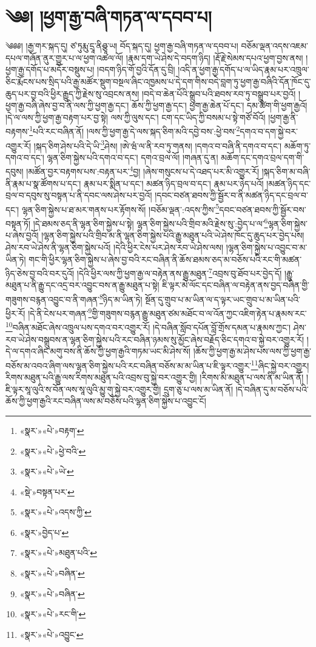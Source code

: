 \chapter{༄༅། །ཕྱག་རྒྱ་བཞི་གཏན་ལ་དབབ་པ།}༄༅༅། །རྒྱ་གར་སྐད་དུ། ཙ་ཏུརྨུ་དྲཱ་ནིཤྩཱ་ཡ། བོད་སྐད་དུ། ཕྱག་རྒྱ་བཞི་གཏན་ལ་དབབ་པ། བཅོམ་ལྡན་འདས་འཇམ་དཔལ་གཞོན་ནུར་གྱུར་པ་ལ་ཕྱག་འཚལ་ལོ། །རྣམ་དག་ཡེ་ཤེས་དེ་བདག་ཉིད། །རྡོ་རྗེ་སེམས་དཔའ་ཕྱག་བྱས་ནས། །ཕྱག་རྒྱ་དགོད་པ་མདོར་བསྡུས་པ། །བདག་ཉིད་གོ་བྱའི་དོན་དུ་བྲི། །འདི་ན་ཕྱག་རྒྱ་དགོད་པ་ལ་ཡིད་རྣམ་པར་འཁྲུལ་ཅིང་རྨོངས་པས་སྲིད་པའི་རྒྱ་མཚོར་སྡུག་བསྔལ་ཞིང་འཁྱམས་པ་དེ་དག་གིས་བདེ་བླག་ཏུ་ཕྱག་རྒྱ་བཞིའི་དོན་ཁོང་དུ་ཆུད་པར་བྱ་བའི་ཕྱིར་རྒྱུད་ཀྱི་རྗེས་སུ་འབྲངས་ནས། །བདེ་བ་ཆེན་པོའི་སྒྲུབ་པའི་ཐབས་རབ་ཏུ་བསྒྲུབ་པར་བྱའོ། །ཕྱག་རྒྱ་བཞི་ཞེས་བྱ་བ་ནི་ལས་ཀྱི་ཕྱག་རྒྱ་དང་། ཆོས་ཀྱི་ཕྱག་རྒྱ་དང་། ཕྱག་རྒྱ་ཆེན་པོ་དང་། དམ་ཚིག་གི་ཕྱག་རྒྱའོ། །དེ་ལ་ལས་ཀྱི་ཕྱག་རྒྱ་བརྟག་པར་བྱ་སྟེ། ལས་ཀྱི་ལུས་དང་། ངག་དང་ཡིད་ཀྱི་བསམ་པ་སྟེ་གཙོ་བོའོ། །ཕྱག་རྒྱ་ནི་བརྟགས་\footnote{«སྣར་»«པེ་»བརྟག་}པའི་རང་བཞིན་ནོ། །ལས་ཀྱི་ཕྱག་རྒྱ་དེ་ལས་སྐད་ཅིག་མའི་དབྱེ་བས་:ཕྱེ་བས་\footnote{«སྣར་»«པེ་»ཕྱེ་བའི་}དགའ་བ་དག་སྐྱེ་བར་འགྱུར་རོ། །སྐད་ཅིག་ཤེས་པའི་དེ་ཡི་\footnote{«སྣར་»«པེ་»ཡེ་}ཤེས། །ཨེ་ཝཾ་ལ་ནི་རབ་ཏུ་གནས། །དགའ་བ་བཞི་ནི་དགའ་བ་དང་། མཆོག་ཏུ་དགའ་བ་དང་། ལྷན་ཅིག་སྐྱེས་པའི་དགའ་བ་དང་། དགའ་བྲལ་ལོ། །གཞན་དུ་ན། མཆོག་དང་དགའ་བྲལ་དག་གི་དབུས། །མཚོན་བྱར་བརྟགས་པས་:བརྟན་པར་\footnote{«སྡེ་»བསྟན་པར་}བྱ། །ཞེས་གསུངས་པ་དེ་འཐད་པར་མི་འགྱུར་རོ། །སྐད་ཅིག་མ་བཞི་ནི་རྣམ་པ་སྣ་ཚོགས་པ་དང་། རྣམ་པར་སྨིན་པ་དང་། མཚན་ཉིད་བྲལ་བ་དང་། རྣམ་པར་ཉེད་པའོ། །མཚན་ཉིད་དང་བྲལ་བ་དབུས་སུ་བསྟན་པ་ནི་དབང་ལས་ཤེས་པར་བྱའོ། །དབང་བཙན་ཐབས་ཀྱི་སྦྱོར་བ་ནི་མཚན་ཉིད་དང་བྲལ་བ་དང་། ལྷན་ཅིག་སྐྱེས་པ་ཐ་མར་གནས་པར་རྟོགས་སོ། །བཅོམ་ལྡན་:འདས་ཀྱིས་\footnote{«སྣར་»«པེ་»འདས་ཀྱི་}དབང་བཙན་ཐབས་ཀྱི་སྦྱོར་བས་བསྟན་ཏོ། །དེ་ཐམས་ཅད་ནི་ལྷན་ཅིག་སྐྱེས་པ་སྟེ། ལྷན་ཅིག་སྐྱེས་པའི་གྲིབ་མའི་རྗེས་སུ་:བྱེད་པ་ལ་\footnote{«སྣར་»བྱེད་པ་}ལྷན་ཅིག་སྐྱེས་པ་ཞེས་བྱའོ། །ལྷན་ཅིག་སྐྱེས་པའི་གྲིབ་མ་ནི་ལྷན་ཅིག་སྐྱེས་པའི་རྒྱུ་མཐུན་པའི་ཡེ་ཤེས་ཁོང་དུ་ཆུད་པར་བྱེད་པས། ཤེས་རབ་ཡེ་ཤེས་ནི་ལྷན་ཅིག་སྐྱེས་པའོ། །དེའི་ཕྱིར་ངེས་པར་ཤེས་རབ་ཡེ་ཤེས་ལས། །ལྷན་ཅིག་སྐྱེས་པ་འབྱུང་བ་མ་ཡིན་ཏེ། གང་གི་ཕྱིར་ལྷན་ཅིག་སྐྱེས་པ་ཞེས་བྱ་བའི་རང་བཞིན་ནི་ཆོས་ཐམས་ཅད་མ་བཅོས་པའི་རང་གི་མཚན་ཉིད་ཅེས་བྱ་བའི་བར་དུའོ། །དེའི་ཕྱིར་ལས་ཀྱི་ཕྱག་རྒྱ་ལ་བརྟེན་ནས་རྒྱུ་མཐུན་\footnote{«སྣར་»«པེ་»མཐུན་པའི་}འབྲས་བུ་ཐོབ་པར་བྱེད་དོ། །རྒྱུ་མཐུན་པ་ནི་རྒྱུ་དང་འདྲ་བར་འབྱུང་བས་ན་རྒྱུ་མཐུན་པ་སྟེ། ཇི་ལྟར་མེ་ལོང་དང་བཞིན་ལ་བརྟེན་ནས་བྱད་བཞིན་གྱི་གཟུགས་བརྙན་འབྱུང་བ་ནི་གཞན་\footnote{«སྣར་»«པེ་»བཞིན་}ཉིད་མ་ཡིན་ཏེ། སྔོན་དུ་གྲུབ་པ་མ་ཡིན་ལ་ད་ལྟར་ཡང་གྲུབ་པ་མ་ཡིན་པའི་ཕྱིར་རོ། །དེ་ནི་ངེས་པར་གཞན་\footnote{«སྣར་»«པེ་»བཞིན་}གྱི་གཟུགས་བརྙན་རྒྱུ་མཐུན་ཙམ་མཐོང་བ་ལ་འོན་ཀྱང་འཇིག་རྟེན་པ་རྣམས་རང་\footnote{«སྣར་»«པེ་»རང་གི་}བཞིན་མཐོང་ཞེས་འཁྲུལ་པས་དགའ་བར་འགྱུར་རོ། །དེ་བཞིན་སློབ་དཔོན་བློ་གྲོས་དམན་པ་རྣམས་ཀྱང་། ཤེས་རབ་ཡེ་ཤེས་བསྒྲུབས་ན་ལྷན་ཅིག་སྐྱེས་པའི་རང་བཞིན་ཉམས་སུ་མྱོང་ཞེས་བརྗོད་ཅིང་དགའ་བ་སྐྱེ་བར་འགྱུར་རོ། །དེ་ལ་དགའ་ཞིང་མགུ་བས་ནི་ཆོས་ཀྱི་ཕྱག་རྒྱའི་གཏམ་ཡང་མི་ཤེས་སོ། །ཆོས་ཀྱི་ཕྱག་རྒྱ་མ་ཤེས་པས་ལས་ཀྱི་ཕྱག་རྒྱ་བཅོས་མ་འབའ་ཞིག་ལས་ལྷན་ཅིག་སྐྱེས་པའི་རང་བཞིན་བཅོས་མ་མ་ཡིན་པ་ཇི་ལྟར་འགྱུར་\footnote{«སྣར་»«པེ་»འབྱུང་}ཞིང་སྐྱེ་བར་འགྱུར། རིགས་མཐུན་པའི་རྒྱུ་ལས་རིགས་མཐུན་པའི་འབྲས་བུ་སྐྱེ་བར་འགྱུར་གྱི། །རིགས་མི་མཐུན་པ་ལས་ནི་མ་ཡིན་ནོ། །ཇི་ལྟར་སཱ་ལུའི་ས་བོན་ལས་སཱ་ལུའི་མྱུ་གུ་སྐྱེ་བར་འགྱུར་གྱི། དྲུག་ཅུ་པ་ལས་མ་ཡིན་ནོ། །དེ་བཞིན་དུ་མ་བཅོས་པའི་ཆོས་ཀྱི་ཕྱག་རྒྱའི་རང་བཞིན་ལས་མ་བཅོས་པའི་ལྷན་ཅིག་སྐྱེས་པ་འབྱུང་ངོ། 